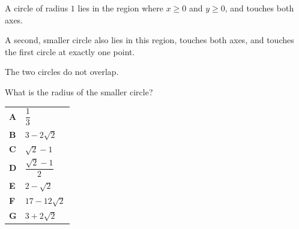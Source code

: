 \documentclass[11pt,a4paper]{article}
\begin{document}
\begin{enumerate}[label=\textbf{\arabic*.},leftmargin=*,itemsep=0pt,start=9]
\questionitem[Geometry]
A circle of radius $1$ lies in the region where $x\ge 0$ and $y\ge 0$, and touches both axes.

A second, smaller circle also lies in this region, touches both axes, and touches the first circle at exactly one point. 

The two circles do not overlap.

What is the radius of the smaller circle?

\begin{center}
\end{center}

\par\vspace*{12pt}
\begin{tabularx}{\linewidth}{@{}>{\bfseries}l Y@{}}
A &
$\dfrac{1}{3}$
\\[0.8em]
B &
$3-2\sqrt{2}$
\\[0.8em]
C &
$\sqrt{2}-1$
\\[0.8em]
D &
$\dfrac{\sqrt{2}-1}{2}$
\\[0.8em]
E &
$2-\sqrt{2}$
\\[0.8em]
F &
$17-12\sqrt{2}$
\\[0.8em]
G &
$3+2\sqrt{2}$
\\
\end{tabularx}


\end{enumerate}
\end{document}
